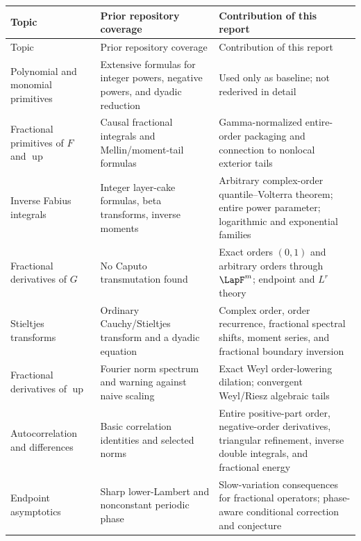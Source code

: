 \documentclass[11pt,oneside]{article}
\theoremstyle{definition}
\theoremstyle{remark}
\newcommand{\Up}{\operatorname{up}}
\newcommand{\1}{\mathbf 1}
\begin{document}
\begin{longtable}{@{}>{\raggedright\arraybackslash}p{}>{\raggedright\arraybackslash}p{}>{\raggedright\arraybackslash}p{}@{}}
\toprule
Topic & Prior repository coverage & Contribution of this report\\
\midrule
\endfirsthead
\toprule
Topic & Prior repository coverage & Contribution of this report\\
\midrule
\endhead
Polynomial and monomial primitives
& Extensive formulas for integer powers, negative powers, and dyadic
  reduction
& Used only as baseline; not rederived in detail\\
\addlinespace
Fractional primitives of $F$ and $\Up$
& Causal fractional integrals and Mellin/moment-tail formulas
& Gamma-normalized entire-order packaging and connection to nonlocal exterior
  tails\\
\addlinespace
Inverse Fabius integrals
& Integer layer-cake formulas, beta transforms, inverse moments
& Arbitrary complex-order quantile--Volterra theorem; entire power parameter;
  logarithmic and exponential families\\
\addlinespace
Fractional derivatives of $G$
& No Caputo transmutation found
& Exact orders $(0,1)$ and arbitrary orders through $\LapF^m$; endpoint and
  $L^r$ theory\\
\addlinespace
Stieltjes transforms
& Ordinary Cauchy/Stieltjes transform and a dyadic equation
& Complex order, order recurrence, fractional spectral shifts, moment series,
  and fractional boundary inversion\\
\addlinespace
Fractional derivatives of $\Up$
& Fourier norm spectrum and warning against naive scaling
& Exact Weyl order-lowering dilation; convergent Weyl/Riesz algebraic tails\\
\addlinespace
Autocorrelation and differences
& Basic correlation identities and selected norms
& Entire positive-part order, negative-order derivatives, triangular
  refinement, inverse double integrals, and fractional energy\\
\addlinespace
Endpoint asymptotics
& Sharp lower-Lambert and nonconstant periodic phase
& Slow-variation consequences for fractional operators; phase-aware
  conditional correction and conjecture\\
\bottomrule
\end{longtable}
\end{document}
